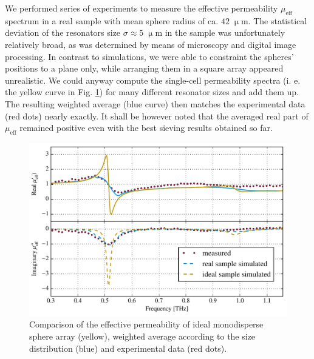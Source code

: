 {We performed series of experiments to measure the effective permeability  $\mu_{\text{eff}}$ spectrum in a real sample with mean sphere radius of ca. $42\;\upmu$m. The statistical deviation of the resonators size $\sigma \approx 5\;\upmu$m in the sample was unfortunately relatively broad, as was determined by means of microscopy and digital image processing. In contrast to simulations, we were able to constraint the spheres' positions to a plane only, while arranging them in a square array appeared unrealistic. We could anyway compute the single-cell permeability spectra (i. e. the yellow curve in Fig. \ref{fg_experimentalConv}) for many different resonator sizes and add them up. The resulting weighted average (blue curve) then matches the experimental data (red dots) nearly exactly. It shall be however noted that the averaged real part of $\mu_{\text{eff}}$ remained positive even with the best sieving results obtained so far.
\begin{figure}[ht]  \caption{Comparison of the effective permeability of ideal monodisperse sphere array (yellow), weighted average according to the size distribution (blue) and experimental data (red dots).}
\label{fg_experimentalConv} \centering 
\includegraphics[width=12cm]{img/Spheres_FDTD_experimentalConv.pdf}
\end{figure}
}
